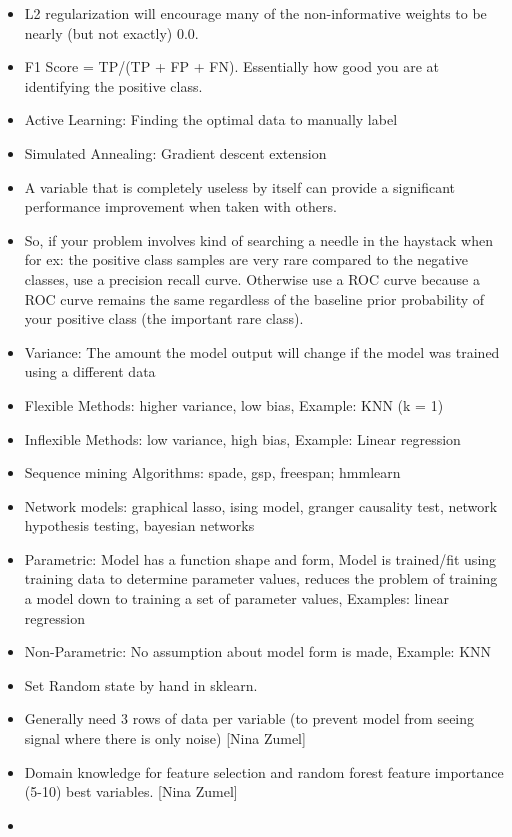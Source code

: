 \documentclass[]{book}
\theoremstyle{definition}
\theoremstyle{definition}
\theoremstyle{definition}
\theoremstyle{remark}
\begin{document}
\begin{itemize}
\item
  L2 regularization will encourage many of the non-informative weights
  to be nearly (but not exactly) 0.0.
\item
  F1 Score = TP/(TP + FP + FN). Essentially how good you are at
  identifying the positive class.
\item
  Active Learning: Finding the optimal data to manually label
\item
  Simulated Annealing: Gradient descent extension
\item
  A variable that is completely useless by itself can provide a
  significant performance improvement when taken with others.
\item
  So, if your problem involves kind of searching a needle in the
  haystack when for ex: the positive class samples are very rare
  compared to the negative classes, use a precision recall curve.
  Otherwise use a ROC curve because a ROC curve remains the same
  regardless of the baseline prior probability of your positive class
  (the important rare class).
\item
  Variance: The amount the model output will change if the model was
  trained using a different data
\item
  Flexible Methods: higher variance, low bias, Example: KNN (k = 1)
\item
  Inflexible Methods: low variance, high bias, Example: Linear
  regression
\item
  Sequence mining Algorithms: spade, gsp, freespan; hmmlearn
\item
  Network models: graphical lasso, ising model, granger causality test,
  network hypothesis testing, bayesian networks
\item
  Parametric: Model has a function shape and form, Model is trained/fit
  using training data to determine parameter values, reduces the problem
  of training a model down to training a set of parameter values,
  Examples: linear regression
\item
  Non-Parametric: No assumption about model form is made, Example: KNN
\item
  Set Random state by hand in sklearn.
\item
  Generally need 3 rows of data per variable (to prevent model from
  seeing signal where there is only noise) {[}Nina Zumel{]}
\item
  Domain knowledge for feature selection and random forest feature
  importance (5-10) best variables. {[}Nina Zumel{]}
\item

\end{itemize}
\end{document}
